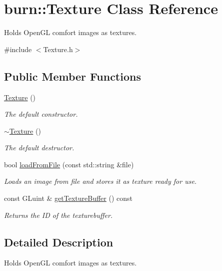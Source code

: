 \hypertarget{classburn_1_1_texture}{\section{burn\-:\-:Texture Class Reference}
\label{classburn_1_1_texture}
}


Holds Open\-G\-L comfort images as textures.  




{\ttfamily \#include $<$Texture.\-h$>$}

\subsection*{Public Member Functions}
\begin{DoxyCompactItemize}
\item 
\hyperlink{classburn_1_1_texture_ac44cabdfa800d3881a78e9bfa6a90a77}{Texture} ()
\begin{DoxyCompactList}\small\item\em The default constructor. \end{DoxyCompactList}\item 
\hyperlink{classburn_1_1_texture_a2652ca0b245b24ef802bb20a99d8248f}{$\sim$\-Texture} ()
\begin{DoxyCompactList}\small\item\em The default destructor. \end{DoxyCompactList}\item 
bool \hyperlink{classburn_1_1_texture_a96d10626c422ea8dbc2cd51105061128}{load\-From\-File} (const std\-::string \&file)
\begin{DoxyCompactList}\small\item\em Loads an image from file and stores it as texture ready for use. \end{DoxyCompactList}\item 
const G\-Luint \& \hyperlink{classburn_1_1_texture_ab72aed3fd26485a51ebe161b87c9b520}{get\-Texture\-Buffer} () const 
\begin{DoxyCompactList}\small\item\em Returns the I\-D of the texturebuffer. \end{DoxyCompactList}\end{DoxyCompactItemize}


\subsection{Detailed Description}
Holds Open\-G\-L comfort images as textures. 

